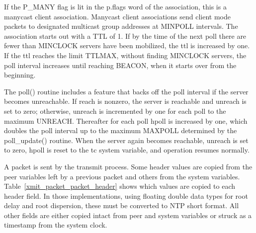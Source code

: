If the P\_MANY flag is lit in the p.flags word of the association,
this is a manycast client association. Manycast client associations
send client mode packets to designated multicast group addresses at
MINPOLL intervals. The association starts out with a TTL of 1. If
by the time of the next poll there are fewer than MINCLOCK servers
have been mobilized, the ttl is increased by one. If the ttl reaches
the limit TTLMAX, without finding MINCLOCK servers, the poll interval
increases until reaching BEACON, when it starts over from the
beginning.

The poll() routine includes a feature that backs off the poll
interval if the server becomes unreachable. If reach is nonzero, the
server is reachable and unreach is set to zero; otherwise, unreach is
incremented by one for each poll to the maximum UNREACH. Thereafter
for each poll hpoll is increased by one, which doubles the poll
interval up to the maximum MAXPOLL determined by the poll\_update()
routine. When the server again becomes reachable, unreach is set to
zero, hpoll is reset to the tc system variable, and operation resumes
normally.

A packet is sent by the transmit process. Some header values are
copied from the peer variables left by a previous packet and others
from the system variables. Table~\ref{xmit_packet_packet_header} shows which values are copied
to each header field. In those implementations, using floating
double data types for root delay and root dispersion, these must be
converted to NTP short format. All other fields are either copied
intact from peer and system variables or struck as a timestamp from
the system clock.

